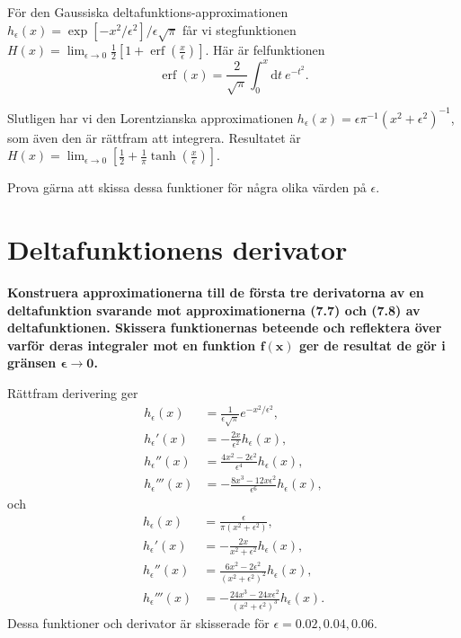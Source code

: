 \documentclass[reprint,
 amsmath,amssymb,
 aps,prl
]{revtex4-1}
\DeclareMathOperator{\erf}{erf}
\begin{document}
För den Gaussiska deltafunktions-approximationen \mbox{$h_\epsilon(x) =\exp\left[-x^2/\epsilon^2\right]/\epsilon\sqrt\pi$} får vi stegfunktionen \mbox{$H(x)=\lim_{\epsilon\rightarrow 0}\tfrac12\left[1+\erf\left(\tfrac x\epsilon\right)\right]$}. Här är felfunktionen
\begin{equation}
    \erf(x)=\frac2{\sqrt\pi}\int_0^x\mathrm dt\ e^{-t^2}.
\end{equation}

Slutligen har vi den Lorentzianska approximationen $h_\epsilon(x)=\epsilon\pi^{-1}(x^2+\epsilon^2)^{-1}$, som även den är rättfram att integrera. Resultatet är \mbox{$H(x)=\lim_{\epsilon\rightarrow 0}\left[\tfrac12+\tfrac1\pi\tanh\left(\tfrac x\epsilon\right)\right]$}.

Prova gärna att skissa dessa funktioner för några olika värden på $\epsilon$.

\section{Deltafunktionens derivator}
\textbf{Konstruera approximationerna till de första tre derivatorna av en deltafunktion svarande mot approximationerna (7.7) och (7.8) av deltafunktionen. Skissera funktionernas beteende och reflektera över varför deras integraler mot en funktion $\boldsymbol{f(x)}$ ger de resultat de gör i gränsen $\boldsymbol{\epsilon\rightarrow 0}$.}

\phantom{o}

Rättfram derivering ger
\begin{align}
    h_\epsilon(x)&=\frac1{\epsilon\sqrt\pi}e^{-x^2/\epsilon^2},\\
    h_\epsilon'(x)&=-\frac{2x}{\epsilon^2}h_\epsilon(x),\\
    h_\epsilon''(x)&=\frac{4x^2-2\epsilon^2}{\epsilon^4}h_\epsilon(x),\\
    h_\epsilon'''(x)&=-\frac{8x^3-12x\epsilon^2}{\epsilon^6}h_\epsilon(x),
\end{align}
och
\begin{align}
    h_\epsilon(x)&= \frac\epsilon{\pi\left(x^2+\epsilon^2\right)},\\
    h_\epsilon'(x)&= -\frac{2 x}{x^2+\epsilon^2}h_\epsilon(x) ,\\
    h_\epsilon''(x)&= \frac{6x^2-2\epsilon^2}{\left(x^2+\epsilon^2\right)^2}h_\epsilon(x) ,\\
    h_\epsilon'''(x)&= -\frac{24 x^3 -24x\epsilon^2}{\left(x^2+\epsilon^2\right)^3}h_\epsilon(x) .
\end{align}
Dessa funktioner och derivator är skisserade för $\epsilon = 0.02,0.04,0.06$.
\end{document}
